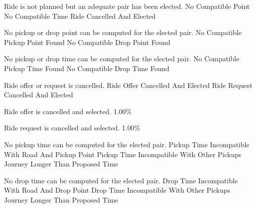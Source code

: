   \startkaosspec
  	 {Ride is not planned but an adequate pair has been elected.}
  	 {No Compatible Point}
  	 {No Compatible Time}
  	 {Ride Cancelled And Elected}
  \stopkaosspec
  
  \startkaosspec
  	 {No pickup or drop point can be computed for the elected pair.}
  	 {No Compatible Pickup Point Found}
  	 {No Compatible Drop Point Found}
  \stopkaosspec
  
  \startkaosspec
  	 {No pickup or drop time can be computed for the elected pair.}
  	 {No Compatible Pickup Time Found}
  	 {No Compatible Drop Time Found}
  \stopkaosspec
  
  \startkaosspec
  	 {Ride offer or request is cancelled.}
  	 {Ride Offer Cancelled And Elected}
  	 {Ride Request Cancelled And Elected}
  \stopkaosspec
  
  \startkaosspec
  	 {Ride offer is cancelled and selected.}
  	 {1.00\%}
  \stopkaosspec
  
  \startkaosspec
  	 {Ride request is cancelled and selected.}
  	 {1.00\%}
  \stopkaosspec

    {}

  \startkaosspec
  	 {No pickup time can be computed for the elected pair.}
  	 {Pickup Time Incompatible With Road And Pickup Point}
  	 {Pickup Time Incompatible With Other Pickups}
  	 {Journey Longer Than Proposed Time}
  \stopkaosspec

  \startkaosspec
  	 {No drop time can be computed for the elected pair.}
  	 {Drop Time Incompatible With Road And Drop Point}
  	 {Drop Time Incompatible With Other Pickups}
  	 {Journey Longer Than Proposed Time}
  \stopkaosspec


